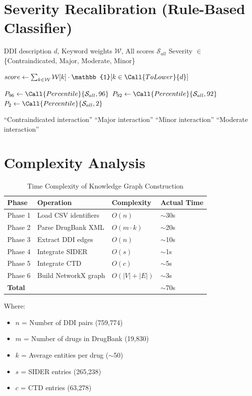 \documentclass[11pt,a4paper]{article}
\begin{document}
\section{Severity Recalibration (Rule-Based Classifier)}

\begin{algorithm}[H]
\caption{EmpiricalSeverityClassifier: DDInter-Validated Classification}
\label{alg:severity}
\begin{algorithmic}[1]
\REQUIRE DDI description $d$, Keyword weights $\mathcal{W}$, All scores $\mathcal{S}_{all}$
\ENSURE Severity $\in$ \{Contraindicated, Major, Moderate, Minor\}

\STATE {}
\STATE $score \gets \sum_{k \in \mathcal{W}} \mathcal{W}[k] \cdot \mathbb{1}[k \in \Call{ToLower}{d}]$

\STATE {}
\STATE $P_{96} \gets \Call{Percentile}{\mathcal{S}_{all}, 96}$ 
\STATE $P_{92} \gets \Call{Percentile}{\mathcal{S}_{all}, 92}$ 
\STATE $P_{2} \gets \Call{Percentile}{\mathcal{S}_{all}, 2}$ 

\STATE {}
    \RETURN ``Contraindicated interaction''
    \RETURN ``Major interaction''
    \RETURN ``Minor interaction''
\ELSE
    \RETURN ``Moderate interaction''
\ENDIF
\end{algorithmic}
\end{algorithm}

\newpage
\section{Complexity Analysis}

\begin{table}[h]
\centering
\caption{Time Complexity of Knowledge Graph Construction}
\label{tab:complexity}
\begin{tabular}{@{}llll@{}}
\toprule
\textbf{Phase} & \textbf{Operation} & \textbf{Complexity} & \textbf{Actual Time} \\
\midrule
Phase 1 & Load CSV identifiers & $O(n)$ & $\sim$30s \\
Phase 2 & Parse DrugBank XML & $O(m \cdot k)$ & $\sim$20s \\
Phase 3 & Extract DDI edges & $O(n)$ & $\sim$10s \\
Phase 4 & Integrate SIDER & $O(s)$ & $\sim$1s \\
Phase 5 & Integrate CTD & $O(c)$ & $\sim$5s \\
Phase 6 & Build NetworkX graph & $O(|V| + |E|)$ & $\sim$3s \\
\midrule
\textbf{Total} & & & $\sim$70s \\
\bottomrule
\end{tabular}
\end{table}

Where:
\begin{itemize}
    \item $n$ = Number of DDI pairs (759,774)
    \item $m$ = Number of drugs in DrugBank (19,830)
    \item $k$ = Average entities per drug ($\sim$50)
    \item $s$ = SIDER entries (265,238)
    \item $c$ = CTD entries (63,278)
\end{itemize}
\end{document}
